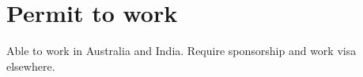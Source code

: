 \section*{Permit to work} %
\label{sec:ptw}

Able to work in Australia and India. Require sponsorship and work visa elsewhere.
